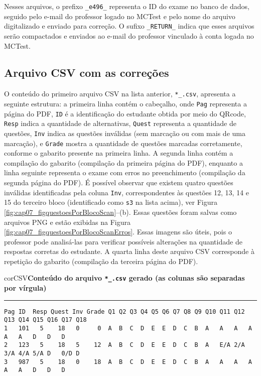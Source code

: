 Nesses arquivos, o prefixo \verb|_e496_| representa o ID do exame no banco de dados, seguido pelo e-mail do professor logado no MCTest e pelo nome do arquivo digitalizado e enviado para correção. O sufixo \verb|_RETURN_| indica que esses arquivos serão compactados e enviados ao e-mail do professor vinculado à conta logada no MCTest. 

\subsection{Arquivo CSV com as correções}\label{sec:CSVcorrecoesQR}

O conteúdo do primeiro arquivo CSV na lista anterior, \verb|*_.csv|, apresenta a seguinte estrutura: a primeira linha contém o cabeçalho, onde \verb|Pag| representa a página do PDF, \verb|ID| é a identificação do estudante obtida por meio do QRcode, \verb|Resp| indica a quantidade de alternativas, \verb|Quest| representa a quantidade de questões, \verb|Inv| indica as questões inválidas (sem marcação ou com mais de uma marcação), e \verb|Grade| mostra a quantidade de questões marcadas corretamente, conforme o gabarito presente na primeira linha. A segunda linha contém a compilação do gabarito (compilação da primeira página do PDF), enquanto a linha seguinte representa o exame com erros no preenchimento (compilação da segunda página do PDF). É possível observar que existem quatro questões inválidas identificadas pela coluna \verb|Inv|, correspondentes às questões 12, 13, 14 e 15 do terceiro bloco (identificado como \verb|s3| na lista acima), ver Figura \ref{fig:cap07_figquestoesPorBlocoScan}--(b). Essas questões foram salvas como arquivos PNG e estão exibidas na Figura \ref{fig:cap07_figquestoesPorBlocoScanErros}.  Essas imagens são úteis, pois o professor pode analisá-las para verificar possíveis alterações na quantidade de respostas corretas do estudante. A quarta linha deste arquivo CSV corresponde à repetição do gabarito (compilação da terceira página do PDF).

\begin{myboxCode}{corCSV}{\textbf{Conteúdo do arquivo \texttt{*\_.csv} gerado (as colunas são separadas por vírgula)}}\vspace{3mm}
\hrule
{\footnotesize
\begin{verbatim}
Pag ID  Resp Quest Inv Grade Q1 Q2 Q3 Q4 Q5 Q6 Q7 Q8 Q9 Q10 Q11 Q12 Q13 Q14 Q15 Q16 Q17 Q18
1   101   5    18   0     0  A  B  C  D  E  E  D  C  B  A   A   A   A   A   A   D   D   D
2   123   5    18   5    12  A  B  C  D  E  E  D  C  B  A   E/A 2/A 3/A 4/A 5/A D   0/D D
3   987   5    18   0    18  A  B  C  D  E  E  D  C  B  A   A   A   A   A   A   D   D   D
\end{verbatim}
}
\end{myboxCode}

